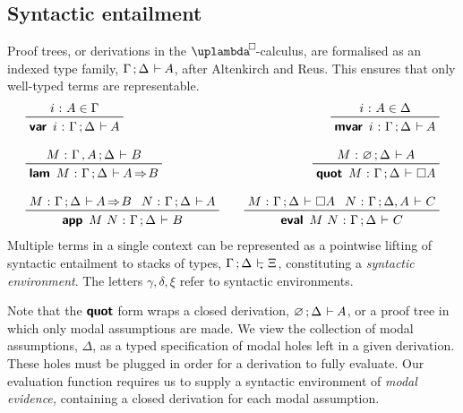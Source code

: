 \documentclass[submission,copyright,creativecommons,sharealike,backref=page]{eptcs}
\newcommand{\uplambdabox}{\uplambda^{\mkern-3mu\Box\mkern-3mu}}
\newcommand{\Xis}{\rlap{$\Xi$}\hphantom{A}}
\newcommand{\sA}{\mkern-2muA}
\renewcommand{\:}{\mathop{\mkern3mu:\mkern3mu}}
\renewcommand{\.}{\mathop{\mkern3mu.\mkern3mu}}
\renewcommand{\;}{\mathop{;}}
\renewcommand{\,}{\mathop{,}}
\newcommand{\e}{\mathrel{\mkern2mu\vdash\mkern1mu}}
\newcommand{\es}{\mathrel{\mkern2mu\vdash_{\mkern-9mu\scriptscriptstyle{\star}}}}
\newcommand{\rf}{\mathop{\Rightarrow\mkern-1mu}}
\newcommand{\var}{\operatorname{\textsf{\textbf{var}}}}
\newcommand{\mvar}{\operatorname{\textsf{\textbf{mvar}}}}
\newcommand{\lam}{\operatorname{\textsf{\textbf{lam}}}}
\newcommand{\app}{\operatorname{\textsf{\textbf{app}}}}
\newcommand{\quot}{\operatorname{\textsf{\textbf{quot}}}}
\newcommand{\eval}{\operatorname{\textsf{\textbf{eval}}}}
\renewcommand{\O}{\varnothing}
\theoremstyle{mystyle}
\begin{document}
\subsection{Syntactic entailment}

Proof trees, or derivations in the $\uplambdabox$-calculus, are formalised as an indexed type family, $\Gamma \; \Delta \e \sA$, after Altenkirch and Reus\cite{AltenkirchR99}.  This ensures that only well-typed terms are representable.
\begin{align*}
  & \prftree
     {i \: A \in \Gamma}
     {\var~i \: \Gamma \; \Delta \e \sA}\quad
  & \prftree
     {i \: A \in \Delta}
     {\mvar~i \: \Gamma \; \Delta \e \sA}\\[.5\baselineskip]
  & \prftree
     {M \: \Gamma \, A \; \Delta \e B}
     {\lam~M \: \Gamma \; \Delta \e \sA \rf B}\quad
  & \prftree
     {M \: \O \; \Delta \e \sA}
     {\quot~M \: \Gamma \; \Delta \e \Box A}\\[.5\baselineskip]
  & \prftree
     {M \: \Gamma \; \Delta \e \sA \rf B}{N \: \Gamma \; \Delta \e \sA}
     {\app~M~N \: \Gamma \; \Delta \e B}\quad
  & \prftree
     {M \: \Gamma \; \Delta \e \Box A}{N \: \Gamma \; \Delta, A \e C}
     {\eval~M~N \: \Gamma \; \Delta \e C}
\end{align*}
Multiple terms in a single context can be represented as a pointwise lifting of syntactic entailment to stacks of types, $\Gamma \; \Delta \es \Xis$, constituting a \emph{syntactic environment}.  The letters $\gamma, \delta, \xi$ refer to syntactic environments.

Note that the $\quot$ form wraps a closed derivation, $\O \; \Delta \e \sA$, or a proof tree in which only modal assumptions are made.  We view the collection of modal assumptions, $\Delta$, as a typed specification of modal holes left in a given derivation.  These holes must be plugged in order for a derivation to fully evaluate.  Our evaluation function requires us to supply a syntactic environment of \emph{modal evidence,} containing a closed derivation for each modal assumption.
\end{document}
